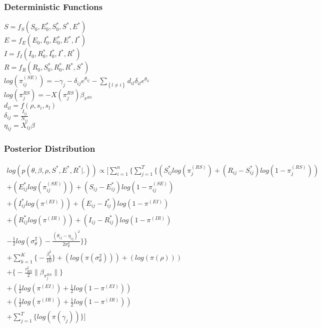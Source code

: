 \documentclass[12pt]{article}
\newcommand \mbreak {\\ \vspace{0.1in}}
\begin{document}
\subsubsection{Deterministic Functions}
$S = f_S(S_0, E^*_0, S^*_0, S^*, E^*)$ \mbreak
$E = f_E(E_0, I^*_0, E^*_0, E^*, I^*)$ \mbreak
$I = f_I(I_0, R^*_0, I^*_0, I^*, R^*)$ \mbreak
$R = f_R(R_0, S^*_0, R^*_0, R^*, S^*)$ \mbreak
$\displaystyle log(\pi^{(SE)}_{ij}) = -\gamma_j-\delta_{ij}e^{\theta_{ij}} - \sum_{\left\{ l \ne i \right\}}d_{il}\delta_{il}e^{\theta_{il}}$\mbreak
$log(\pi_j^{RS}) = -X(\pi_j^{RS}) \beta_{\pi^{RS}}$\mbreak
$d_{il} = f(\rho, s_i, s_l)$\mbreak
$\delta_{ij} = \frac{I_{ij}}{N_{ij}}$ \mbreak
$\eta_{ij} = X_{ij}\beta$
\subsubsection{Posterior Distribution}

\begin{center}
\begin{multline}
\displaystyle
log(p(\theta,\beta,\rho,S^*,E^*,R^*|.)) \propto \Bigg[ 
    \sum_{i=1}^n \bigg\{ \sum_{j=1}^T
        \Big\{
            (S^*_{ij}log(\pi_j^{(RS)}) + (R_{ij} - S^*_{ij})log(1-\pi_j^{(RS)})) \\
            + (E^*_{ij}log(\pi_{ij}^{(SE)})) + (S_{ij} - E^*_{ij})log(1-\pi_{ij}^{(SE)}) \\
            + (I^*_{ij}log(\pi^{(EI)})) + (E_{ij} - I^*_{ij})log(1-\pi^{(EI)}) \\
            + (R^*_{ij}log(\pi^{(IR)})) + (I_{ij} - R^*_{ij})log(1-\pi^{(IR)}) \\
    - \frac{1}{2}log(\sigma^2_{\theta}) - \frac{(\theta_{ij}-\eta_{ij})^2}{2\sigma^2_{\theta}}\Big\}\bigg\} \\
    + \sum_{k = 1}^K\bigg\{-\frac{\beta^2_k}{10}\bigg\}
            + (log(\pi(\sigma^2_{\theta})))
            + (log(\pi(\rho)))\\
            + \bigg\{ -\frac{\tau^2_{RS}}{2}\|\beta_{\pi_j^{RS}}\|  \bigg\} \\ 
            + (\frac{1}{2}log(\pi^{(EI)}) + \frac{1}{2}log(1-\pi^{(EI)})) \\
            + (\frac{1}{2}log(\pi^{(IR)}) + \frac{1}{2}log(1-\pi^{(IR)}))    \\
            + \sum_{j=1}^{T} \bigg\{ log(\pi(\gamma_j)) \bigg\} \Bigg]\\
\end{multline}
\end{center}
\end{document}
